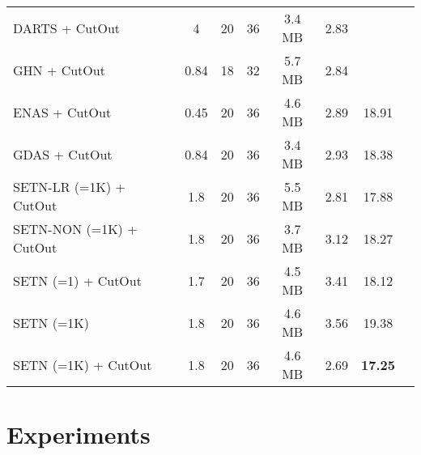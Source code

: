 \documentclass[10pt,twocolumn,letterpaper]{article}
\def\NAME{{SETN}}
\begin{document}
\begin{table*}[t!]
\begin{tabular}{| l | c | c | c | c | c | c | c |}
 DARTS + CutOut~\cite{liu2019darts}         & 4         & 20  & 36  &    3.4 MB    &          2.83             &         \\
 GHN + CutOut~\cite{zhang2019graph}         & 0.84      & 18  & 32  &    5.7 MB    &          2.84             &          \\
 ENAS + CutOut~\cite{pmlr-v80-pham18a}      & 0.45      & 20  & 36  &    4.6 MB    &          2.89             &  18.91   \\
 GDAS + CutOut~\cite{dong2019search}        & 0.84      & 20  & 36  &    3.4 MB    &          2.93             &  18.38     \\
    \hline
 {\NAME}-LR (=1K) + CutOut               &   1.8      & 20  & 36  &  5.5 MB    &          2.81             &  17.88     \\
 {\NAME}-NON (=1K) + CutOut              &   1.8      & 20  & 36  &  3.7 MB    &          3.12             &  18.27     \\
 {\NAME} (=1) + CutOut                   &   1.7      & 20  & 36  &  4.5 MB    &          3.41             &  18.12     \\
 {\NAME} (=1K)                           &   1.8      & 20  & 36  &  4.6 MB    &          3.56             &  19.38     \\
{\NAME} (=1K) + CutOut                  &   1.8      & 20  & 36  &  4.6 MB    &          2.69             &  \textbf{17.25} \\\hline
\end{tabular}
\vspace{2mm}
\caption{
We compare {\NAME} and other algorithms on CIFAR-10 and CIFAR-100.
The top block presents state-of-the-art architectures designed by human experts.
The bottom block presents architectures that are automatically discovered by machine.
``'' indicates the total number of cells in the CNN, and ``'' denotes the number of the filter channel in the first cell.
``CutOut'' indicates the data argumentation approach~\cite{CUTOUT}.
 denotes the results reproduced by ourself.
The bottom five lines show results for different variants of our approach.
We run each model three times and report the mean error (lower is better).
}
\vspace{-2mm}
\label{table:CIFAR}
\end{table*}





\section{Experiments}\label{sec:experiments}
\end{document}
